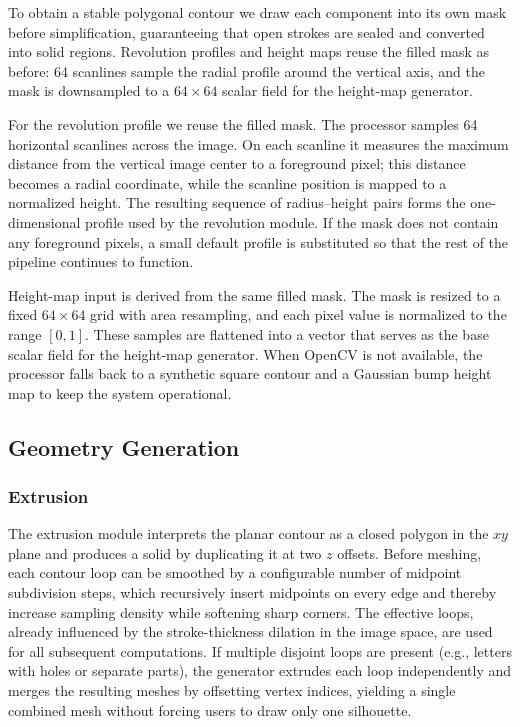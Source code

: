 \documentclass[11pt, a4paper]{article}
\begin{document}
To obtain a stable polygonal contour we draw each component into its own mask before simplification, guaranteeing that open strokes are sealed and converted into solid regions. Revolution profiles and height maps reuse the filled mask as before: 64 scanlines sample the radial profile around the vertical axis, and the mask is downsampled to a $64\times64$ scalar field for the height-map generator.

For the revolution profile we reuse the filled mask. The processor samples 64 horizontal scanlines across the image. On each scanline it measures the maximum distance from the vertical image center to a foreground pixel; this distance becomes a radial coordinate, while the scanline position is mapped to a normalized height. The resulting sequence of radius--height pairs forms the one-dimensional profile used by the revolution module. If the mask does not contain any foreground pixels, a small default profile is substituted so that the rest of the pipeline continues to function.

Height-map input is derived from the same filled mask. The mask is resized to a fixed $64 \times 64$ grid with area resampling, and each pixel value is normalized to the range $[0, 1]$. These samples are flattened into a vector that serves as the base scalar field for the height-map generator. When OpenCV is not available, the processor falls back to a synthetic square contour and a Gaussian bump height map to keep the system operational.

\subsection{Geometry Generation}
\subsubsection{Extrusion}
The extrusion module interprets the planar contour as a closed polygon in the $xy$ plane and produces a solid by duplicating it at two $z$ offsets. Before meshing, each contour loop can be smoothed by a configurable number of midpoint subdivision steps, which recursively insert midpoints on every edge and thereby increase sampling density while softening sharp corners. The effective loops, already influenced by the stroke-thickness dilation in the image space, are used for all subsequent computations. If multiple disjoint loops are present (e.g., letters with holes or separate parts), the generator extrudes each loop independently and merges the resulting meshes by offsetting vertex indices, yielding a single combined mesh without forcing users to draw only one silhouette.
\end{document}
